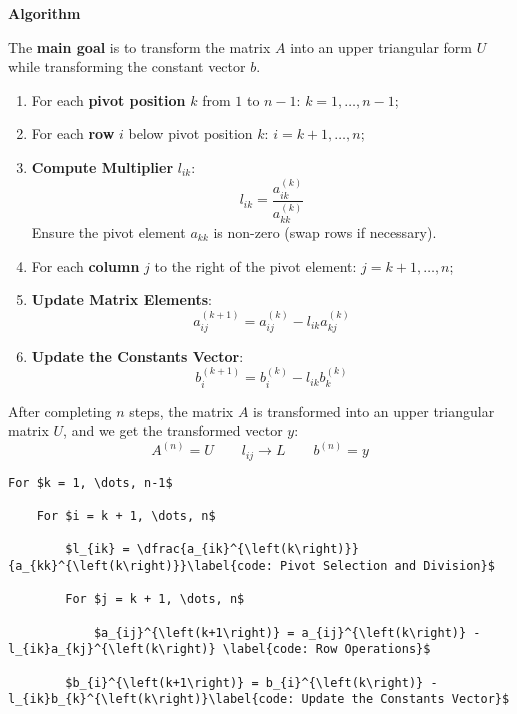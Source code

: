 \highspace
\begin{flushleft}
    \textcolor{Green3}{ \textbf{Algorithm}}
\end{flushleft}
The \textbf{main goal} is to transform the matrix $A$ into an upper triangular form $U$ while transforming the constant vector $b$.
\begin{enumerate}
    \item For each \textbf{pivot position} $k$ from $1$ to $n-1$: $k = 1, \dots, n-1$;

    \item For each \textbf{row} $i$ below pivot position $k$: $i = k+1, \dots, n$;

    \item \textbf{Compute Multiplier} $l_{ik}$:
    \begin{equation*}
        l_{ik} = \dfrac{a_{ik}^{\left(k\right)}}{a_{kk}^{\left(k\right)}}
    \end{equation*}
    Ensure the pivot element $a_{kk}$ is non-zero (swap rows if necessary).

    \item For each \textbf{column} $j$ to the right of the pivot element: $j = k+1, \dots, n$;
    
    \item \textbf{Update Matrix Elements}:
    \begin{equation*}
        a_{ij}^{\left(k+1\right)} = a_{ij}^{\left(k\right)} - l_{ik} a_{kj}^{\left(k\right)}
    \end{equation*}

    \item \textbf{Update the Constants Vector}:
    \begin{equation*}
        b_{i}^{\left(k+1\right)} = b_{i}^{\left(k\right)} - l_{ik} b_{k}^{\left(k\right)}
    \end{equation*}
\end{enumerate}
After completing $n$ steps, the matrix $A$ is transformed into an upper triangular matrix $U$, and we get the transformed vector $y$:
\begin{equation*}
    A^{(n)} = U \hspace{2em} l_{ij} \rightarrow L \hspace{2em} b^{(n)} = y
\end{equation*}

\newpage

\begin{lstlisting}[mathescape=true, caption={Gaussian Elimination Pseudo-Code}]
For $k = 1, \dots, n-1$

    For $i = k + 1, \dots, n$

        $l_{ik} = \dfrac{a_{ik}^{\left(k\right)}}{a_{kk}^{\left(k\right)}}\label{code: Pivot Selection and Division}$

        For $j = k + 1, \dots, n$

            $a_{ij}^{\left(k+1\right)} = a_{ij}^{\left(k\right)} - l_{ik}a_{kj}^{\left(k\right)} \label{code: Row Operations}$

        $b_{i}^{\left(k+1\right)} = b_{i}^{\left(k\right)} - l_{ik}b_{k}^{\left(k\right)}\label{code: Update the Constants Vector}$
\end{lstlisting}

